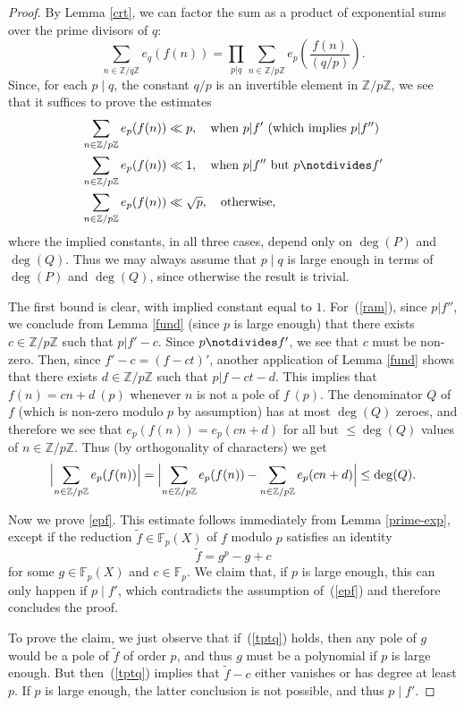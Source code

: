 \documentclass[12pt,a4paper,reqno]{amsart}
\numberwithin{equation}{section}
\theoremstyle{plain}
\theoremstyle{definition}
\newcommand\F{\mathbb{F}}
\newcommand\Z{\mathbb{Z}}
\begin{document}
\begin{proof} By Lemma \ref{crt}, we can factor the sum as a product
  of exponential sums over the prime divisors of $q$:
$$ 
\sum_{n \in \Z/q\Z} e_q( f(n) ) = \prod_{p|q} \sum_{n \in \Z/p\Z}
e_p\left( \frac{f(n)}{(q/p)} \right).
$$
Since, for each $p\mid q$, the constant $q/p$ is an invertible element
in $\Z/p\Z$, we see that it suffices to prove the estimates
\begin{align}
\sum_{n \in \Z/p\Z} e_p(f(n))&\ll p,\quad\text{when  $p|f'$ (which implies $p|f''$)}\\
\label{ram}
\sum_{n \in \Z/p\Z} e_p(f(n))& \ll 1,\quad\text{when $p|f''$ but $p \notdivides f'$}\\
\label{epf}
\sum_{n \in \Z/p\Z} e_p(f(n)) &\ll \sqrt{p},\quad\text{otherwise,}
\end{align}
where the implied constants, in all three cases, depend only on
$\deg(P)$ and $\deg(Q)$. Thus we may always assume that $p\mid q$ is
large enough in terms of $\deg(P)$ and $\deg(Q)$, since otherwise the
result is trivial.

The first bound is clear, with implied constant equal to $1$.
For~(\ref{ram}), since $p|f''$, we conclude from Lemma \ref{fund}
(since $p$ is large enough) that there exists $c \in \Z/p\Z$ such that
$p|f'-c$. Since $p \notdivides f'$, we see that $c$ must be non-zero.
Then, since $f'-c = (f-ct)'$, another application of Lemma \ref{fund}
shows that there exists $d \in \Z/p\Z$ such that $p|f-ct-d$.  This
implies that $f(n) = cn+d\ (p)$ whenever $n$ is not a pole of $f\
(p)$. The denominator $Q$ of $f$ (which is non-zero modulo $p$ by
assumption) has at most $\deg(Q)$ zeroes, and therefore we see that
$e_p(f(n)) = e_p(cn+d)$ for all but $\leq \deg(Q)$ values of $n \in
\Z/p\Z$.  Thus (by orthogonality of characters) we get
$$ 
\Bigl|\sum_{n \in \Z/p\Z} e_p(f(n))\Bigr|=\Bigl|\sum_{n \in \Z/p\Z}
e_p(f(n))-\sum_{n \in\Z/p\Z} e_p( cn+d)\Bigr|\leq \deg(Q).
$$

Now we prove \eqref{epf}. This estimate follows immediately from Lemma
\ref{prime-exp}, except if the reduction $\tilde{f}\in\F_p(X)$ of $f$
modulo $p$ satisfies an identity
\begin{equation}\label{tptq}
  \tilde{f} = g^p - g + c
\end{equation}
for some $g \in \F_p(X)$ and $c \in \F_p$. We claim that, if $p$ is
large enough, this can only happen if $p\mid f'$, which contradicts
the assumption of~(\ref{epf}) and therefore concludes the proof.

To prove the claim, we just observe that if~(\ref{tptq}) holds, then
any pole of $g$ would be a pole of $\tilde{f}$ of order $p$, and thus
$g$ must be a polynomial if $p$ is large enough. But then~(\ref{tptq})
implies that $\tilde{f}-c$ either vanishes or has degree at least $p$.  If $p$ is large enough, the latter conclusion is not possible, and thus $p\mid f'$.
\end{proof}
\end{document}
